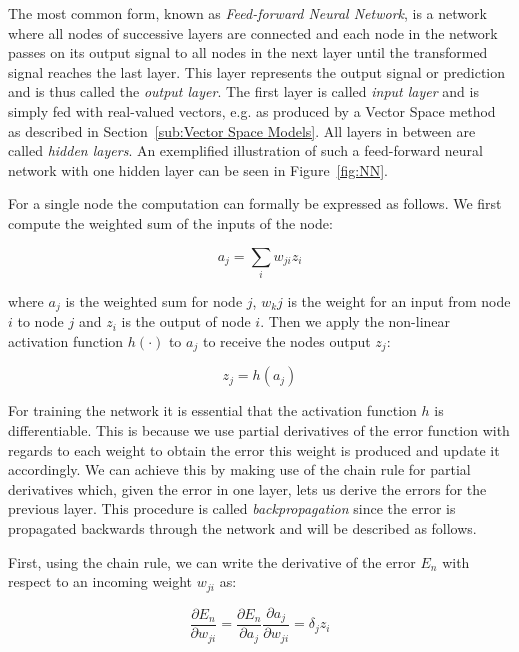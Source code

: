 The most common form, known as \emph{Feed-forward Neural Network}, is a network where all nodes of successive layers are connected and each node in the network passes on its output signal to all nodes in the next layer until the transformed signal reaches the last layer. This layer represents the output signal or prediction and is thus called the \emph{output layer}. The first layer is called \emph{input layer} and is simply fed with real-valued vectors, e.g. as produced by a Vector Space method as described in Section~\ref{sub:Vector Space Models}. All layers in between are called \emph{hidden layers}. An exemplified illustration of such a feed-forward neural network with one hidden layer can be seen in Figure~\ref{fig:NN}.

For a single node the computation can formally be expressed as follows. We first compute the weighted sum of the inputs of the node:

\begin{equation}
  a_j = \sum_i w_{ji} z_i
  \label{eq:NN weighted sum}
\end{equation}

where $a_j$ is the weighted sum for node $j$, $w_kj$ is the weight for an input from node $i$ to node $j$ and $z_i$ is the output of node $i$. Then we apply the non-linear activation function $h(\cdot)$ to $a_j$ to receive the nodes output $z_j$:

\begin{equation}
  z_j = h(a_j)
  \label{eq:NN activation}
\end{equation}

For training the network it is essential that the activation function $h$ is differentiable. This is because we use partial derivatives of the error function with regards to each weight to obtain the error this weight is produced and update it accordingly. We can achieve this by making use of the chain rule for partial derivatives which, given the error in one layer, lets us derive the errors for the previous layer. This procedure is called \emph{backpropagation} since the error is propagated backwards through the network and will be described as follows.

First, using the chain rule, we can write the derivative of the error $E_n$ with respect to an incoming weight $w_{ji}$ as:

\begin{equation}
	\frac{\partial E_n}{\partial w_{ji}} = \frac{\partial E_n}{\partial a_j} \frac{\partial a_j}{\partial w_{ji}} = \delta_j z_i
	\label{eq:NN derivatives}
\end{equation}

